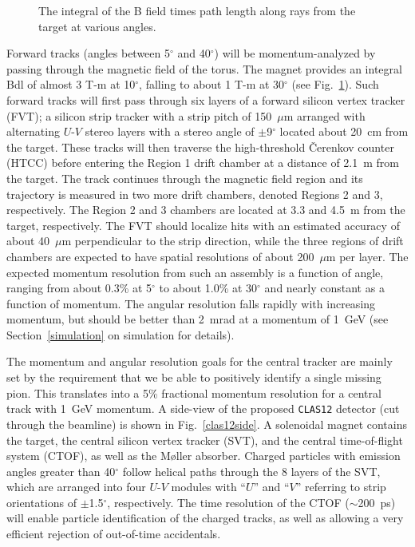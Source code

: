 \begin{figure}[htbp]
\vspace{6.5cm}
\caption{\small{The integral of the B field times path length along
rays from the target at various angles.}}
\label{bdl}
\end{figure}

Forward tracks (angles between 5$^{\circ}$ and 40$^{\circ}$) will be 
momentum-analyzed by passing through the magnetic field of the torus.
The magnet provides an integral Bdl of almost 3 T-m at 10$^{\circ}$, 
falling to about 1 T-m at 30$^{\circ}$ (see Fig.~\ref{bdl}).  Such forward 
tracks will first pass through six layers of a forward silicon vertex tracker 
(FVT); a silicon strip tracker with a strip pitch of 150~$\mu$m arranged with 
alternating $U$-$V$ stereo layers with a stereo angle of $\pm$9$^{\circ}$ 
located about 20~cm from the target.  These tracks will then traverse the 
high-threshold {\v C}erenkov counter (HTCC) before entering the Region 1 
drift chamber at a distance of 2.1~m from the target.  The track continues 
through the magnetic field region and its trajectory is measured in two 
more drift chambers, denoted Regions 2 and 3, respectively.  The Region 2 
and 3 chambers are located at 3.3 and 4.5~m from the target, respectively.  
The FVT should localize hits with an estimated accuracy of about 40~$\mu$m 
perpendicular to the strip direction, while the three regions of drift 
chambers are expected to have spatial resolutions of about 200~$\mu$m per 
layer.  The expected momentum resolution from such an assembly is a function 
of angle, ranging from about 0.3\% at 5$^{\circ}$ to about 1.0\% at 
30$^{\circ}$ and nearly constant as a function of momentum.  The angular 
resolution falls rapidly with increasing momentum, but should be better than 
2~mrad at a momentum of 1~GeV (see Section~\ref{simulation} on simulation for 
details).

The momentum and angular resolution goals for the central tracker are 
mainly set by the requirement that we be able to positively identify a 
single missing pion.  This translates into a 5\% fractional momentum 
resolution for a central track with 1~GeV momentum.  A side-view of the 
proposed {\tt CLAS12} detector (cut through the beamline) is shown in 
Fig.~\ref{clas12side}.  A solenoidal magnet contains the target, the 
central silicon vertex tracker (SVT), and the central time-of-flight 
system (CTOF), as well as the M{\o}ller absorber.  Charged particles with 
emission angles greater than 40$^{\circ}$ follow helical paths through the 
8 layers of the SVT, which are arranged into four $U$-$V$ modules with 
``$U$'' and ``$V$'' referring to strip orientations of $\pm$1.5$^{\circ}$, 
respectively.  The time resolution of the CTOF ($\sim$200~ps) will enable 
particle identification of the charged tracks, as well as allowing a very 
efficient rejection of out-of-time accidentals.

